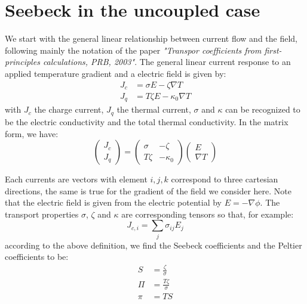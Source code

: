 \documentclass{article}
\begin{document}
\section{Seebeck in the uncoupled case}
We start with the general linear relationship between current flow and 
the field, following mainly the notation of the paper 
\emph{"Transpor coefficients from first-principles calculations, PRB, 2003"}. The 
general linear current response to an applied temperature gradient and a electric field is
given by:
\begin{align}
    J_c&=\sigma E - \zeta \nabla T \\
    J_q&=T\zeta E - \kappa_0 \nabla T 
\end{align} 
with $J_c$ the charge current, $J_q$ the thermal current, $\sigma$ and $\kappa$ can
be recognized to be the electric conductivity and the total 
thermal conductivity. In the matrix form, we have:
\begin{equation}
    \begin{pmatrix} J_c \\ J_q \end{pmatrix} 
    = \begin{pmatrix} \sigma & -\zeta \\ T\zeta & -\kappa_0 \end{pmatrix} 
      \begin{pmatrix} E \\ \nabla T \end{pmatrix}
\end{equation}

Each currents are vectors with element $i,j,k$ correspond to three cartesian directions,
the same is true for the gradient of the field we consider here. Note that
the electric field is given from the electric potential by 
$E = -\nabla \phi$. The 
transport properties $\sigma$, $\zeta$ and $\kappa$ are corresponding tensors 
so that, for example:
\begin{equation}
    J_{c,i} = \sum_j \sigma_{ij} E_j
\end{equation}
according to the above definition, we find the Seebeck coefficients and the Peltier 
coefficients to be:
\begin{align}
    S   &=\frac{\zeta}{\sigma} \\
    \Pi &=\frac{T\zeta}{\sigma} \\
    \pi &= TS
\end{align}
\end{document}
